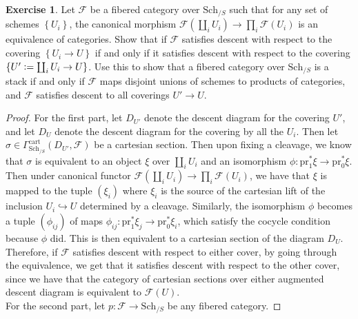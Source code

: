 \documentclass[psamsfonts, 12pt]{amsart}
\theoremstyle{definition}
\newtheorem{exer}[thm]{Exercise}
\theoremstyle{remark}
\newcommand{\set}[1]{\left\lbrace #1 \right\rbrace}
\newcommand{\defeq}{\vcentcolon=}
\begin{document}
%
\setcounter{thm}{12}
%
\begin{exer}
Let $\mathcal{F}$ be a fibered category over $\mathrm{Sch}_{/S}$ such that for
any set of schemes $\set{U_i}$, the canonical morphism
$\mathcal{F}(\coprod_iU_i) \to \prod_i \mathcal{F}(U_i)$ is an equivalence of
categories. Show that if $\mathcal{F}$ satisfies descent with respect to the
covering $\set{U_i \to U}$ if and only if it satisfies descent with respect to
the covering $\set{U' \defeq \coprod_i U_i \to U}$. Use this to show that a fibered
category over $\mathrm{Sch}_{/S}$ is a stack if and only if $\mathcal{F}$ maps disjoint
unions of schemes to products of categories, and $\mathcal{F}$ satisfies descent
to all coverings $U' \to U$.
\end{exer}
%
\begin{proof}
For the first part, let $D_{U'}$ denote the descent diagram for the
covering $U'$, and let $D_U$ denote the descent diagram for the covering by
all the $U_i$. Then let
$\sigma \in \Gamma^{\mathrm{cart}}_{\mathrm{Sch}_{/S}}(D_{U'},\mathcal{F})$
be a cartesian section. Then upon fixing a cleavage, we know that $\sigma$ is equivalent
to an object $\xi$ over $\coprod_i U_i$ and an isomorphism
$\phi : \mathrm{pr}_1^*\xi \to \mathrm{pr}_0^*\xi$. Then under canonical functor
$\mathcal{F}(\coprod_i U_i) \to \prod_i \mathcal{F}(U_i)$, we have that
$\xi$ is mapped to the tuple $(\xi_i)$ where $\xi_i$ is the source of the cartesian
lift of the inclusion $U_i \hookrightarrow U$ determined by a cleavage. Similarly,
the isomorphism $\phi$ becomes a tuple $(\phi_{ij})$ of maps
$\phi_{ij} : \mathrm{pr}_1^*\xi_j \to \mathrm{pr}_0^*\xi_i$, which satisfy the
cocycle condition because $\phi$ did. This is then equivalent to a cartesian
section of the diagram $D_U$. Therefore, if $\mathcal{F}$ satisfies descent
with respect to either cover, by going through the equivalence, we get that it
satisfies descent with respect to the other cover, since we have that the
category of cartesian sections over either augmented descent diagram is
equivalent to $\mathcal{F}(U)$. \\

For the second part, let $p : \mathcal{F} \to \mathrm{Sch}_{/S}$ be any fibered
category. 
\end{proof}
%
\end{document}
